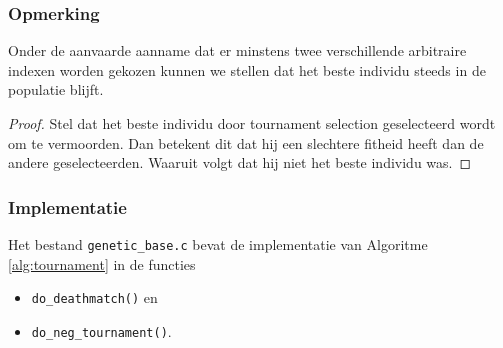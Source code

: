 
\subsubsection{Opmerking}
\label{ssub:notetournament}
Onder de aanvaarde aanname dat er minstens twee verschillende arbitraire indexen worden gekozen kunnen we stellen dat het beste individu steeds in de populatie blijft.
\begin{proof}
Stel dat het beste individu door tournament selection geselecteerd wordt om te vermoorden. Dan betekent dit dat hij een slechtere fitheid heeft dan de andere geselecteerden. Waaruit volgt dat hij niet het beste individu was.  \Lightning
\end{proof}

\subsubsection{Implementatie}
Het bestand \texttt{genetic\_base.c} bevat de implementatie van Algoritme \ref{alg:tournament} in de functies \begin{itemize}
  \setlength{\itemsep}{1pt}
  \setlength{\parskip}{0pt}
  \setlength{\parsep}{0pt}
\item\texttt{do\_deathmatch()} en
\item\texttt{do\_neg\_tournament()}.
 \end{itemize}  


%